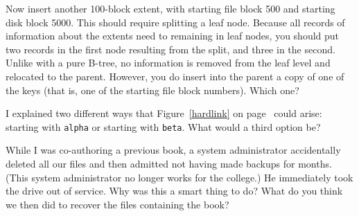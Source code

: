 \begin{chapterEnumerate}
\begin{enumerate}
Now insert another 100-block extent, with starting file block 500 and
starting disk block 5000. This should require splitting a leaf
node. Because all records of information about the extents need to
remaining in leaf nodes, you should put two records in the first node
resulting from the split, and three in the second.  Unlike with a pure
B-tree, no information is removed from the leaf level and relocated to
the parent.  However, you do insert into the parent a copy of one of
the keys (that is, one of the starting file block numbers).  Which one?
\end{enumerate}
\item
I explained two different ways that Figure~\ref{hardlink} on page~\pageref{hardlink} could
arise: starting with \verb|alpha| or starting with \verb|beta|.  What
would a third option be?
\item
While I was co-authoring a previous book, a system administrator
accidentally deleted all our files and then admitted not having made
backups for months.  (This system administrator no longer works for
the college.)  He immediately took the drive out of service.  Why was
this a smart thing to do?  What do you think we then did to recover the
files containing the book?
\end{chapterEnumerate}

